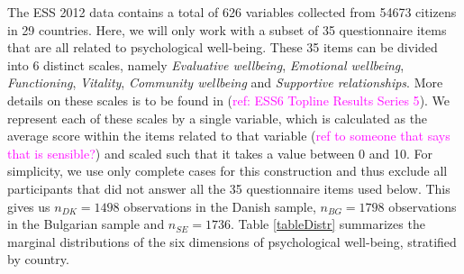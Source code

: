 \documentclass[titlepage,11pt,twoside]{article}
\newcommand{\hl}[1]{\textcolor{magenta}{#1}}
\begin{document}
The ESS 2012 data contains a total of 626 variables collected from 54673 citizens in 29 countries. Here, we will only work with a subset of 35 questionnaire items that are all related to psychological well-being. These 35 items can be divided into 6 distinct scales, namely \textit{Evaluative wellbeing}, \textit{Emotional wellbeing}, \textit{Functioning}, \textit{Vitality}, \textit{Community wellbeing} and \textit{Supportive relationships}. More details on these scales is to be found in (\hl{ref: ESS6 Topline Results Series 5}). We represent each of these scales by a single variable, which is calculated as the average score within the items related to that variable (\hl{ref to someone that says that is sensible?}) and scaled such that it takes a value between 0 and 10. For simplicity, we use only complete cases for this construction and thus exclude all participants that did not answer all the 35 questionnaire items used below. This gives us $n_{DK} = 1498$ observations in the Danish sample, $n_{BG} = 1798$ observations in the Bulgarian sample and $n_{SE} = 1736$. Table \ref{tableDistr} summarizes the marginal distributions of the six dimensions of psychological well-being, stratified by country.
\end{document}
